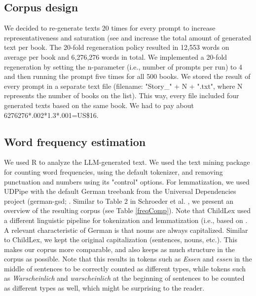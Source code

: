 \documentclass[jou, a4paper]{apa7}
\begin{document}
\subsection*{Corpus design}

We decided to re-generate texts 20 times for every prompt to increase representativeness and saturation (see \citep{schnell_understanding_2021} and increase the total amount of generated text per book. The 20-fold regeneration policy resulted in 12,553 words on average per book and 6,276,276 words in total. We implemented a 20-fold regeneration by setting the n-parameter (i.e., number of prompts per run) to 4 and then running the prompt five times for all 500 books. We stored the result of every prompt in a separate text file (filename: "Story\_" + N + ".txt", where N represents the number of books on the list). This way, every file included four generated texts based on the same book. We had to pay about 6276276*.002*1.3*.001=US\$16. 

\subsection*{Word frequency estimation}

We used R to analyze the LLM-generated text. We used the text mining package \citep[tm; ][]{feinerer_text_2008} for counting word frequencies, using the default tokenizer, and removing punctuation and numbers using its "control" options. For lemmatization, we used UDPipe \citep{straka_tokenizing_2017} with the default German treebank from the Universal Dependencies project (german-gsd; \citep{mcdonald_universal_2013}. Similar to Table 2 in Schroeder et al. \citep{schroeder_childlex_2015}, we present an overview of the resulting corpus (see Table \ref{freqComp}). Note that ChildLex used a different linguistic pipeline for tokenization and lemmatization (i.e., based on \citep{jurish_word_2013, yli-jyra_tagh_2006}. 
A relevant characteristic of German is that nouns are always capitalized. Similar to ChildLex, we kept the original capitalization (sentences, nouns, etc.). This makes our coprus more comparable, and also keeps as much structure in the corpus as possible. Note that this results in tokens such as \textit{Essen} and \textit{essen} in the middle of sentences to be correctly counted as different types, while tokens such as \textit{Warscheinlich} and \textit{warscheinlich} at the beginning of sentences to be counted as different types as well, which might be surprising to the reader. 
\end{document}
